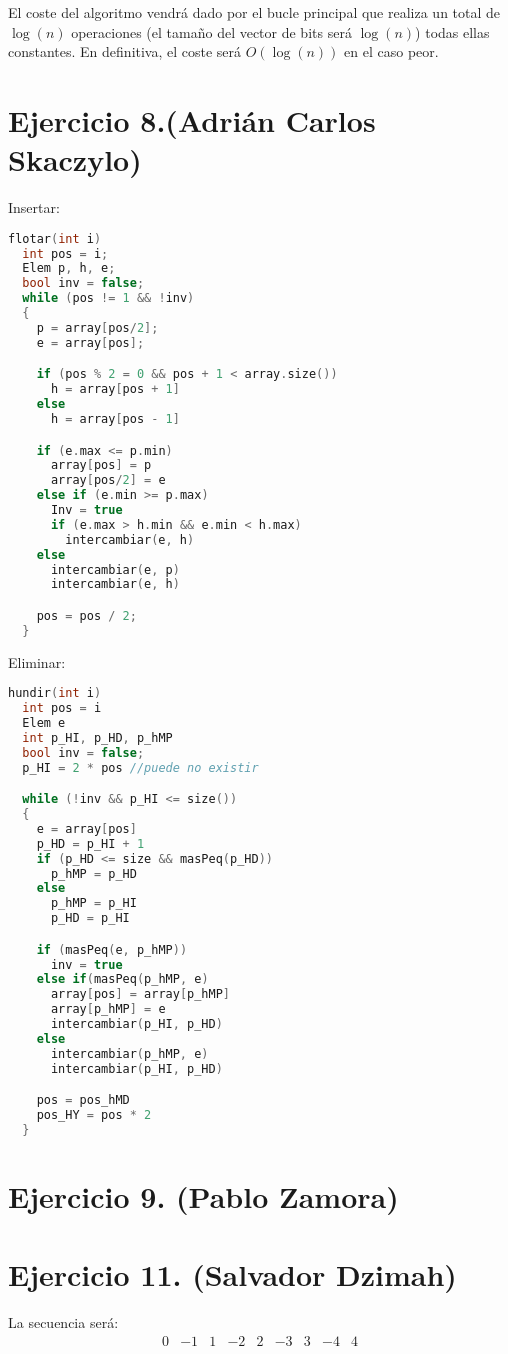 \documentclass[10pt,a4paper,openright]{book}
\theoremstyle{break}
\begin{document}
El coste del algoritmo vendrá dado por el bucle principal que realiza un total de $\log\left( n \right)$ operaciones (el tamaño del vector de bits será $\log\left( n \right)$) todas ellas constantes. En definitiva, el coste será $O\left( \log\left( n \right) \right)$ en el caso peor.

\section{Ejercicio 8.(Adrián Carlos Skaczylo)}%
\label{sec:ejercicio_8_adrian_carlos_skaczylo_}
Insertar:

\begin{minipage}{\linewidth}
\begin{lstlisting}[language=c++]
flotar(int i) 
  int pos = i;
  Elem p, h, e;
  bool inv = false;
  while (pos != 1 && !inv)
  {
    p = array[pos/2];
    e = array[pos];

    if (pos % 2 = 0 && pos + 1 < array.size()) 
      h = array[pos + 1]
    else 
      h = array[pos - 1]

    if (e.max <= p.min) 
      array[pos] = p
      array[pos/2] = e
    else if (e.min >= p.max) 
      Inv = true
      if (e.max > h.min && e.min < h.max)
        intercambiar(e, h)
    else 
      intercambiar(e, p)
      intercambiar(e, h)

    pos = pos / 2;
  }
\end{lstlisting}
\end{minipage}

Eliminar:

\begin{minipage}{\linewidth}
\begin{lstlisting}[language=c++]
hundir(int i) 
  int pos = i
  Elem e
  int p_HI, p_HD, p_hMP
  bool inv = false;
  p_HI = 2 * pos //puede no existir

  while (!inv && p_HI <= size())
  {
    e = array[pos]
    p_HD = p_HI + 1
    if (p_HD <= size && masPeq(p_HD))
      p_hMP = p_HD
    else 
      p_hMP = p_HI
      p_HD = p_HI

    if (masPeq(e, p_hMP))
      inv = true
    else if(masPeq(p_hMP, e) 
      array[pos] = array[p_hMP]
      array[p_hMP] = e
      intercambiar(p_HI, p_HD)
    else 
      intercambiar(p_hMP, e)
      intercambiar(p_HI, p_HD)

    pos = pos_hMD
    pos_HY = pos * 2
  }
\end{lstlisting}
\end{minipage}

\section{Ejercicio 9. (Pablo Zamora)}%
\label{sec:ejercicio_9_pablo_zamora_}

\section{Ejercicio 11. (Salvador Dzimah)}%
\label{sec:ejercicio_11_salvador_dzimah_}
La secuencia será:
\[
    \begin{matrix} 0 & -1 & 1 & -2 & 2 & -3 & 3 & -4 & 4 \end{matrix} 
\]
\end{document}
